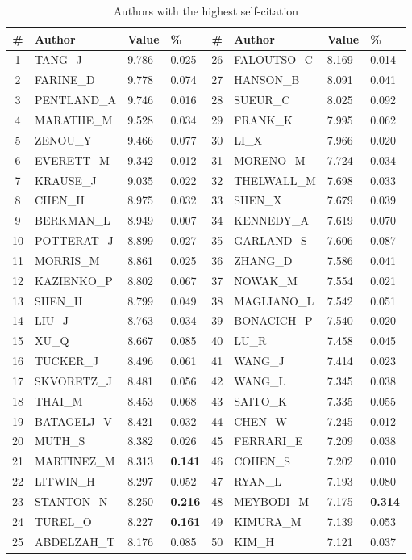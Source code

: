 \documentclass[11pt]{article} %
\begin{document}
\begin{table}
\caption{Authors with the highest self-citation} \label{authcite}\medskip
\renewcommand{\arraystretch}{0.95}
\small
\begin{center}
\begin{tabular}{c|l|l|l|c|l|l|l|} 
\# &	Author & Value &	\% &  \# &	Author& Value & \% \\ \hline 
1&	TANG\_J&	9.786&	0.025&	26&	FALOUTSO\_C&	8.169&	0.014\\
2&	FARINE\_D&	9.778&	0.074&	27&	HANSON\_B&	8.091&	0.041\\
3&	PENTLAND\_A&	9.746&	0.016&	28&	SUEUR\_C&	8.025&	0.092\\
4&	MARATHE\_M&	9.528&	0.034&	29&	FRANK\_K&	7.995&	0.062\\
5&	ZENOU\_Y&	9.466&	0.077&	30&	LI\_X&	7.966&	0.020\\
6&	EVERETT\_M&	9.342&	0.012&	31&	MORENO\_M&	7.724&	0.034\\
7&	KRAUSE\_J&	9.035&	0.022&	32&	THELWALL\_M&	7.698&	0.033\\
8&	CHEN\_H&	8.975&	0.032&	33&	SHEN\_X&	7.679&	0.039\\
9&	BERKMAN\_L&	8.949&	0.007&	34&	KENNEDY\_A&	7.619&	0.070\\
10&	POTTERAT\_J&	8.899&	0.027&	35&	GARLAND\_S&	7.606&	0.087\\
11&	MORRIS\_M&	8.861&	0.025&	36&	ZHANG\_D&	7.586&	0.041\\
12&	KAZIENKO\_P&	8.802&	0.067&	37&	NOWAK\_M&	7.554&	0.021\\
13&	SHEN\_H&	8.799&	0.049&	38&	MAGLIANO\_L&	7.542&	0.051\\
14&	LIU\_J&	8.763&	0.034&	39&	BONACICH\_P&	7.540&	0.020\\
15&	XU\_Q&	8.667&	0.085&	40&	LU\_R&	7.458&	0.045\\
16&	TUCKER\_J&	8.496&	0.061&	41&	WANG\_J&	7.414&	0.023\\
17&	SKVORETZ\_J&	8.481&	0.056&	42&	WANG\_L&	7.345&	0.038\\
18&	THAI\_M&	8.453&	0.068&	43&	SAITO\_K&	7.335&	0.055\\
19&	BATAGELJ\_V&	8.421&	0.032&	44&	CHEN\_W&	7.245&	0.012\\
20&	MUTH\_S&	8.382&	0.026&	45&	FERRARI\_E&	7.209&	0.038\\
21&	MARTINEZ\_M&	8.313&	\textbf{0.141}&	46&	COHEN\_S&	7.202&	0.010\\
22&	LITWIN\_H&	8.297&	0.052&	47&	RYAN\_L&	7.193&	0.080\\
23&	STANTON\_N&	8.250&	\textbf{0.216}&	48&	MEYBODI\_M&	7.175&	\textbf{0.314}\\
24&	TUREL\_O&	8.227&	\textbf{0.161}&	49&	KIMURA\_M&	7.139&	0.053\\
25&	ABDELZAH\_T&	8.176&	0.085&	50&	KIM\_H&	7.121&	0.037\\
\end{tabular} 
\end{center}
\end{table}  
\end{document}
